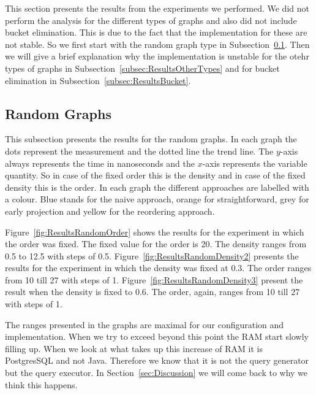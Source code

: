 This section presents the results from the experiments we performed. We did not perform the analysis for the different types of graphs and also did not include bucket elimination. This is due to the fact that the implementation for these are not stable. So we first start with the random graph type in Subsection~\ref{subsec:ResultsRandom}. Then we will give a brief explanation why the implementation is unstable for the otehr types of graphs in Subsection~\ref{subsec:ResultsOtherTypes} and for bucket elimination in Subsection~\ref{subsec:ResultsBucket}. 

\subsection{Random Graphs} \label{subsec:ResultsRandom}
This subsection presents the results for the random graphs. In each graph the dots represent the measurement and the dotted line the trend line. The $y$-axis always represents the time in nanoseconds and the $x$-axis represents the variable quantity. So in case of the fixed order this is the density and in case of the fixed density this is the order. In each graph the different approaches are labelled with a colour. Blue stands for the naive approach, orange for straightforward, grey for early projection and yellow for the reordering approach.

  Figure~\ref{fig:ResultsRandomOrder} shows the results for the experiment in which the order was fixed. The fixed value for the order is 20. The density ranges from 0.5 to 12.5 with steps of 0.5. Figure~\ref{fig:ResultsRandomDensity2} presents the results for the experiment in which the density was fixed at 0.3. The order ranges from 10 till 27 with steps of 1. Figure~\ref{fig:ResultsRandomDensity3} present the result when the density is fixed to 0.6. The order, again, ranges from 10 till 27 with steps of 1. 
  
 The ranges presented in the graphs are maximal for our configuration and implementation. When we try to exceed beyond this point the RAM start slowly filling up. When we look at what takes up this increase of RAM it is PostgresSQL and not Java. Therefore we know that it is not the query generator but the query executor. In Section~\ref{sec:Discussion} we will come back to why we think this happens. 

